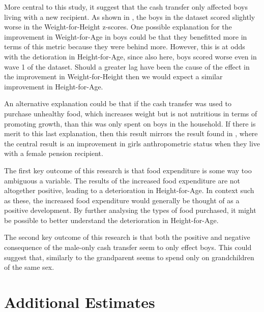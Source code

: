 \documentclass[a4paper,british]{article}\usepackage[]{graphicx}\usepackage[]{color}
\begin{document}
More central to this study, it suggest that the cash transfer only
affected boys living with a new recipient. As shown in ,
the boys in the dataset scored slightly worse in the Weight-for-Height
z-scores. One possible explanation for the improvement in Weight-for-Age
in boys could be that they benefitted more in terms of this metric
because they were behind more. However, this is at odds with the detioration
in Height-for-Age, since also here, boys scored worse even in wave
1 of the dataset. Should a greater lag have been the cause of the
effect in the improvement in Weight-for-Height then we would expect
a similar improvement in Height-for-Age.

An alternative explanation could be that if the cash transfer was
used to purchase unhealthy food, which increases weight but is not
nutritious in terms of promoting growth, than this was only spent
on boys in the household. If there is merit to this last explanation,
then this result mirrors the result found in \citet{duflo2000child,duflo2003grandmothers},
where the central result is an improvement in girls anthropometric
status when they live with a female pension recipient.

The first key outcome of this research is that food expenditure is
some way too ambiguous a variable. The results of the increased food
expenditure are not altogether positive, leading to a deterioration
in Height-for-Age. In context such as these, the increased food expenditure
would generally be thought of as a positive development. By further
analysing the types of food purchased, it might be possible to better
understand the deterioration in Height-for-Age.

The second key outcome of this research is that both the positive
and negative consequence of the male-only cash transfer seem to only
effect boys. This could suggest that, similarly to \citet{duflo2000child,duflo2003grandmothers}
the grandparent seems to spend only on grandchildren of the same sex.

\printbibliography


\appendix

\section{Additional Estimates}

\label{sec:add_estimates}
\end{document}
